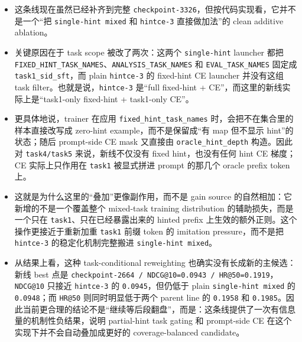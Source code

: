 \begin{itemize}
\item 这条线现在虽然已经补齐到完整 \texttt{checkpoint-3326}，但按代码实现看，它并不是一个“把 \texttt{single-hint mixed} 和 \texttt{hintce-3} 直接做加法”的 clean additive ablation。
\item 关键原因在于 task scope 被改了两次：这两个 \texttt{single-hint} launcher 都把 \texttt{FIXED\_HINT\_TASK\_NAMES}、\texttt{ANALYSIS\_TASK\_NAMES} 和 \texttt{EVAL\_TASK\_NAMES} 固定成 \texttt{task1\_sid\_sft}，而 plain \texttt{hintce-3} 的 fixed-hint CE launcher 并没有这组 task filter。也就是说，\texttt{hintce-3} 是“full fixed-hint + CE”，而这里的新线实际上是“task1-only fixed-hint + task1-only CE”。
\item 更具体地说，trainer 在应用 \texttt{fixed\_hint\_task\_names} 时，会把不在集合里的样本直接改写成 zero-hint example，而不是保留成“有 map 但不显示 hint”的状态；随后 prompt-side CE mask 又直接由 \texttt{oracle\_hint\_depth} 构造。因此对 \texttt{task4/task5} 来说，新线不仅没有 fixed hint，也没有任何 hint CE 梯度；CE 实际上只作用在 \texttt{task1} 被显式拼进 prompt 的那几个 oracle prefix token 上。
\item 这就是为什么这里的“叠加”更像副作用，而不是 gain source 的自然相加：它新增的不是一个覆盖整个 mixed-task training distribution 的辅助损失，而是一个只在 \texttt{task1}、只在已经暴露出来的 hinted prefix 上生效的额外正则。这个操作更接近于重新加重 \texttt{task1} 前缀 token 的 imitation pressure，而不是把 \texttt{hintce-3} 的稳定化机制完整搬进 \texttt{single-hint mixed}。
\item 从结果上看，这种 task-conditional reweighting 也确实没有长成新的主候选：新线 best 点是 \texttt{checkpoint-2664 / NDCG@10=0.0943 / HR@50=0.1919}，\texttt{NDCG@10} 只接近 \texttt{hintce-3} 的 \texttt{0.0945}，但仍低于 plain \texttt{single-hint mixed} 的 \texttt{0.0948}；而 \texttt{HR@50} 则同时明显低于两个 parent line 的 \texttt{0.1958} 和 \texttt{0.1985}。因此当前更合理的结论不是“继续等后段翻盘”，而是：这条线提供了一次有信息量的机制性负结果，说明 partial-hint task gating 和 prompt-side CE 在这个实现下并不会自动叠加成更好的 coverage-balanced candidate。
\end{itemize}
